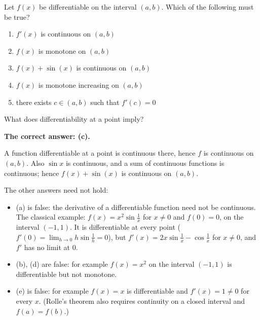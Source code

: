 
\begin{question}
Let $f(x)$ be differentiable on the interval $(a,b)$. Which of the following must be true?
\begin{enumerate}
  \item[(a)] $f'(x)$ is continuous on $(a,b)$
  \item[(b)] $f(x)$ is monotone on $(a,b)$
  \item[(c)] $f(x)+\sin(x)$ is continuous on $(a,b)$
  \item[(d)] $f(x)$ is monotone increasing on $(a,b)$
  \item[(e)] there exists $c\in(a,b)$ such that $f'(c)=0$
\end{enumerate}
\end{question}

\begin{hint}
What does differentiability at a point imply?
\end{hint}

\begin{solution}
\textbf{The correct answer: (c).}

A function differentiable at a point is continuous there, hence $f$ is continuous on $(a,b)$. Also $\sin x$ is continuous, and a sum of continuous functions is continuous; hence $f(x)+\sin(x)$ is continuous on $(a,b)$.

The other answers need not hold:
\begin{itemize}
  \item (a) is false: the derivative of a differentiable function need not be continuous. The classical example: $f(x)=x^2\sin\frac1x$ for $x\neq0$ and $f(0)=0$, on the interval $(-1,1)$. It is differentiable at every point ($f'(0)=\lim_{h\to0}h\sin\frac1h=0$), but $f'(x)=2x\sin\frac1x-\cos\frac1x$ for $x\ne0$, and $f'$ has no limit at $0$.
  \item (b), (d) are false: for example $f(x)=x^2$ on the interval $(-1,1)$ is differentiable but not monotone.
  \item (e) is false: for example $f(x)=x$ is differentiable and $f'(x)=1\ne0$ for every $x$. (Rolle's theorem also requires continuity on a closed interval and $f(a)=f(b)$.)
\end{itemize}
\end{solution}
